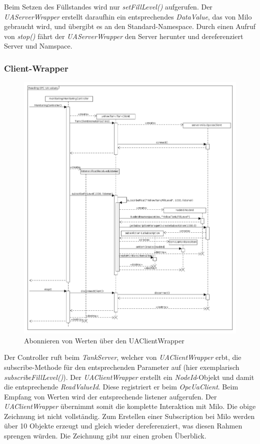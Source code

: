 \documentclass[parskip=full]{scrartcl}
\begin{document}
Beim Setzen des Füllstandes wird nur \emph{setFillLevel()} aufgerufen. Der \emph{UAServerWrapper} erstellt daraufhin
ein entsprechendes \emph{DataValue}, das von Milo gebraucht wird, und übergibt es an den Standard-Namespace.
Durch einen Aufruf von \emph{stop()} fährt der \emph{UAServerWrapper} den Server herunter und dereferenziert
Server und Namspace.

\subsubsection{Client-Wrapper}
\label{milo-wrapper-diagram}
\begin{figure}[H]
  \centering
  \includegraphics[scale=0.4]{design/sequence-diagrams/sequence-subscribe-client-value.png}
  \caption{Abonnieren von Werten über den UAClientWrapper}
\end{figure}
Der Controller ruft beim \emph{TankServer}, welcher von \emph{UAClientWrapper} erbt, die subscribe-Methode für den entsprechenden Parameter auf
(hier exemplarisch \emph{subscribeFillLevel()}). Der \emph{UAClientWrapper} erstellt ein \emph{NodeId}-Objekt und damit die
entsprechende \emph{ReadValueId}. Diese registriert er beim \emph{OpcUaClient}.
Beim Empfang von Werten wird der entsprechende listener aufgerufen. Der \emph{UAClientWrapper} übernimmt somit die
komplette Interaktion mit Milo. Die obige Zeichnung ist nicht vollständig. Zum Erstellen einer Subscription bei Milo werden über 10
Objekte erzeugt und gleich wieder dereferenziert, was diesen Rahmen sprengen würden. Die Zeichnung gibt nur einen groben Überblick.
\end{document}
